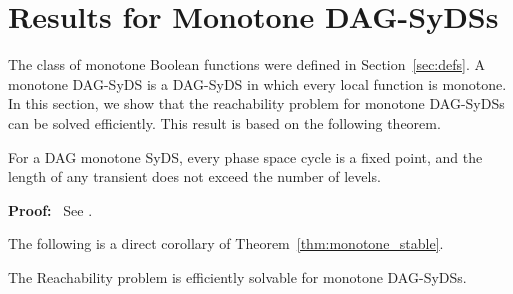 \section{Results for Monotone DAG-SyDSs}
\label{sec:monotone_functions}

The class of monotone Boolean functions were defined in
Section~\ref{sec:defs}.
A monotone DAG-SyDS is a DAG-SyDS in which every local
function is monotone.
In this section, we show that the reachability problem
for monotone DAG-SyDSs can be solved efficiently.
This result is based on the following theorem. 

\begin{theorem}\label{thm:monotone_stable}
For a DAG monotone SyDS, every phase space cycle is a fixed point, 
and the length of any transient does not exceed the number of levels.
\end{theorem}

\noindent
\textbf{Proof:}~ See \cite{Rosenkrantz-etal-2020}.

\smallskip

The following is a direct corollary of
Theorem~\ref{thm:monotone_stable}. 

\begin{corollary}\label{cor:poly_monotone_dag_syds}
The Reachability problem is efficiently solvable for monotone
DAG-SyDSs.
\end{corollary}
